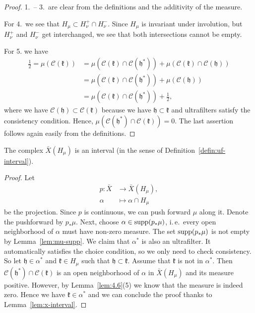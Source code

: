 \begin{proof}
  1.\ -- 3.\ are clear from the definitions and the additivity of the measure.

  For 4.\ we see that \(H_\mu \subset H_\nu^+ \cap H_\nu^-\). Since \(H_\mu\) is invariant under involution, but \(H_\nu^+\) and \(H_\nu^-\) get interchanged, we see that both intersections cannot be empty.

  For 5. we have
  \begin{align*}
    \frac{1}{2} = \mu(\mathcal{C}(\mathfrak{k}))
    & = \mu(\mathcal{C}(\mathfrak{k}) \cap \mathcal{C}(\mathfrak{h^\ast})) + \mu(\mathcal{C}(\mathfrak{k}) \cap \mathcal{C}(\mathfrak{h}))\\
    & = \mu(\mathcal{C}(\mathfrak{k}) \cap \mathcal{C}(\mathfrak{h^\ast})) + \mu(\mathcal{C}(\mathfrak{h}))\\
    & = \mu(\mathcal{C}(\mathfrak{k}) \cap \mathcal{C}(\mathfrak{h^\ast})) + \frac{1}{2},
  \end{align*}
  where we have \(\mathcal{C}(\mathfrak{h}) \subset \mathcal{C}(\mathfrak{k})\) because we have \(\mathfrak{h} \subset \mathfrak{k}\) and ultrafilters satisfy the consistency condition. Hence, \(\mu(\mathcal{C}(\mathfrak{h^\ast}) \cap \mathcal{C}(\mathfrak{k})) = 0\). The last assertion follows again easily from the definitions.
\end{proof}

\begin{lemma}[{\cite[Lemma 4.7]{MR3509968}}]
  \label{lem:interval}
  The complex \(\bar X(H_\mu)\) is an interval (in the sense of Definition~\ref{defin:uf-interval}).
\end{lemma}

\begin{proof}
  Let
  \begin{align*}
    p \colon \bar X &\to \bar X (H_\mu),\\
    \alpha &\mapsto \alpha \cap H_\mu
  \end{align*}
  be the projection. Since \(p\) is continuous, we can push forward \(\mu\) along it. Denote the pushforward by \(p_\ast\mu\). Next, choose \(\alpha \in \operatorname{supp}(p_\ast \mu)\), i.\,e.\ every open neighborhood of \(\alpha\) must have non-zero measure. The set \(\operatorname{supp}(p_\ast \mu)\) is not empty by Lemma~\ref{lem:mu-supp}. We claim that \(\alpha^\ast\) is also an ultrafilter. It automatically satisfies the choice condition, so we only need to check consistency. So let \(\mathfrak{h} \in \alpha^\ast\) and \(\mathfrak{k} \in H_\mu\) such that \(\mathfrak{h} \subset \mathfrak{k}\). Assume that \(\mathfrak{k}\) is not in \(\alpha^\ast\). Then \(\mathcal{C}(\mathfrak{h^\ast}) \cap \mathcal{C}(\mathfrak{k})\) is an open neighborhood of \(\alpha\) in \(\bar X(H_\mu)\) and its measure positive. However, by Lemma~\ref{lem:4.6}(5) we know that the measure is indeed zero. Hence we have \(\mathfrak{k} \in \alpha^\ast\) and we can conclude the proof thanks to Lemma~\ref{lem:x-interval}.
\end{proof}

